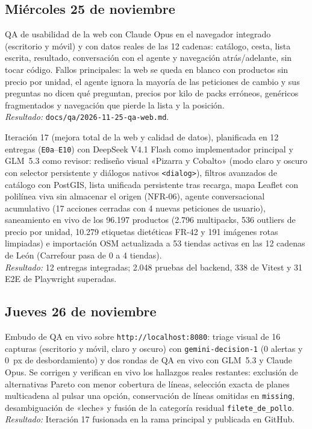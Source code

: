 \documentclass[11pt,a4paper]{article}
\newcommand{\actividad}[3]{\item[\textbf{[#1]}] #2 \\ \textit{Resultado:} #3}
\begin{document}
	\subsection*{Miércoles 25 de noviembre}
	\begin{description}[leftmargin=0pt, itemsep=6pt]
		\actividad{Análisis}{QA de usabilidad de la web con Claude Opus en el navegador integrado (escritorio y móvil) y con datos reales de las 12 cadenas: catálogo, cesta, lista escrita, resultado, conversación con el agente y navegación atrás/adelante, sin tocar código. Fallos principales: la web se queda en blanco con productos sin precio por unidad, el agente ignora la mayoría de las peticiones de cambio y sus preguntas no dicen qué preguntan, precios por kilo de packs erróneos, genéricos fragmentados y navegación que pierde la lista y la posición.}{\texttt{docs/qa/2026-11-25-qa-web.md}.}
		\actividad{Tarea}{Iteración 17 (mejora total de la web y calidad de datos), planificada en 12 entregas (\texttt{E0a}--\texttt{E10}) con DeepSeek V4.1 Flash como implementador principal y GLM~5.3 como revisor: rediseño visual «Pizarra y Cobalto» (modo claro y oscuro con selector persistente y diálogos nativos \texttt{<dialog>}), filtros avanzados de catálogo con PostGIS, lista unificada persistente tras recarga, mapa Leaflet con polilínea viva sin almacenar el origen (NFR-06), agente conversacional acumulativo (17 acciones cerradas con 4 nuevas peticiones de usuario), saneamiento en vivo de los 96.197 productos (2.796 multipacks, 536 outliers de precio por unidad, 10.279 etiquetas dietéticas FR-42 y 191 imágenes rotas limpiadas) e importación OSM actualizada a 53 tiendas activas en las 12 cadenas de León (Carrefour pasa de 0 a 4 tiendas).}{12 entregas integradas; 2.048 pruebas del backend, 338 de Vitest y 31 E2E de Playwright superadas.}
	\end{description}

	\subsection*{Jueves 26 de noviembre}
	\begin{description}[leftmargin=0pt, itemsep=6pt]
		\actividad{Análisis}{Embudo de QA en vivo sobre \texttt{http://localhost:8080}: triage visual de 16 capturas (escritorio y móvil, claro y oscuro) con \texttt{gemini-decision-1} (0 alertas y 0~px de desbordamiento) y dos rondas de QA en vivo con GLM~5.3 y Claude Opus. Se corrigen y verifican en vivo los hallazgos reales restantes: exclusión de alternativas Pareto con menor cobertura de líneas, selección exacta de planes multicadena al pulsar una opción, conservación de líneas omitidas en \texttt{missing}, desambiguación de «leche» y fusión de la categoría residual \texttt{filete\_de\_pollo}.}{Iteración 17 fusionada en la rama principal y publicada en GitHub.}
	\end{description}
\end{document}
